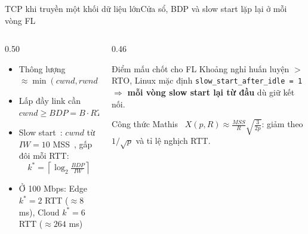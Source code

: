 \documentclass[aspectratio=169,10pt]{beamer}
\begin{document}
\begin{frame}{TCP khi truyền một khối dữ liệu lớn}{Cửa sổ, BDP và slow start lặp lại ở mỗi vòng FL}
  \begin{columns}[T]
    \begin{column}{0.50\textwidth}
      \begin{itemize}
        \item Thông lượng $\approx \min(cwnd, rwnd)/RTT$
        \item Lấp đầy link cần $cwnd \ge BDP = B \cdot RTT$
        \item Slow start~\cite{rfc5681}: $cwnd$ từ $IW = 10$ MSS~\cite{rfc6928}, gấp đôi mỗi RTT:
        \[ k^{*} = \left\lceil \log_2 \tfrac{BDP}{IW} \right\rceil \]
        \item Ở 100 Mbps: Edge $k^*=2$ RTT ($\approx 8$ ms), Cloud $k^*=6$ RTT ($\approx 264$ ms)
      \end{itemize}
    \end{column}
    \begin{column}{0.46\textwidth}
      \small
      \begin{alertblock}{Điểm mấu chốt cho FL}
        Khoảng nghỉ huấn luyện $>$ RTO, Linux mặc định \texttt{slow\_start\_after\_idle = 1} $\Rightarrow$ \textbf{mỗi vòng slow start lại từ đầu} dù giữ kết nối.
      \end{alertblock}
      \begin{exampleblock}{Công thức Mathis~\cite{mathis1997macroscopic}}
        $X(p, R) \approx \frac{MSS}{R}\sqrt{\frac{3}{2p}}$: giảm theo $1/\sqrt{p}$ và tỉ lệ nghịch RTT.
      \end{exampleblock}
    \end{column}
  \end{columns}
\end{frame}
\end{document}
